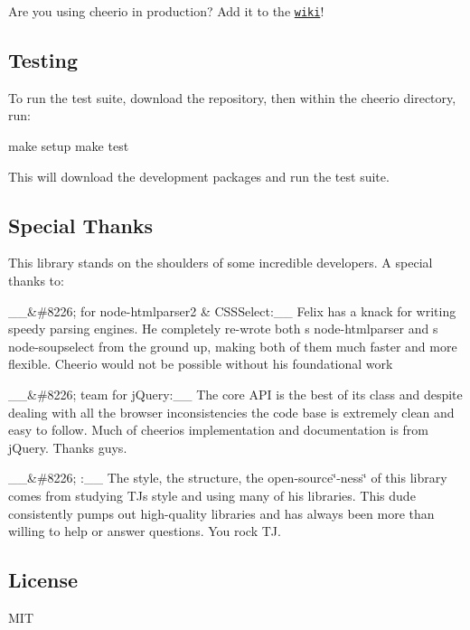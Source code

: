 Are you using cheerio in production? Add it to the \href{https://github.com/cheeriojs/cheerio/wiki/Cheerio-in-Production}{\tt wiki}!

\subsection*{Testing}

To run the test suite, download the repository, then within the cheerio directory, run\+:


\begin{DoxyCode}
make setup
make test
\end{DoxyCode}


This will download the development packages and run the test suite.

\subsection*{Special Thanks}

This library stands on the shoulders of some incredible developers. A special thanks to\+:

\+\_\+\+\_\+\&\#8226;  for node-\/htmlparser2 \& C\+S\+S\+Select\+:\+\_\+\+\_\+ Felix has a knack for writing speedy parsing engines. He completely re-\/wrote both \textquotesingle{}s {\ttfamily node-\/htmlparser} and \textquotesingle{}s {\ttfamily node-\/soupselect} from the ground up, making both of them much faster and more flexible. Cheerio would not be possible without his foundational work

\+\_\+\+\_\+\&\#8226;  team for j\+Query\+:\+\_\+\+\_\+ The core A\+PI is the best of its class and despite dealing with all the browser inconsistencies the code base is extremely clean and easy to follow. Much of cheerio\textquotesingle{}s implementation and documentation is from j\+Query. Thanks guys.

\+\_\+\+\_\+\&\#8226; \+:\+\_\+\+\_\+ The style, the structure, the open-\/source\char`\"{}-\/ness\char`\"{} of this library comes from studying TJ\textquotesingle{}s style and using many of his libraries. This dude consistently pumps out high-\/quality libraries and has always been more than willing to help or answer questions. You rock TJ.

\subsection*{License}

M\+IT 